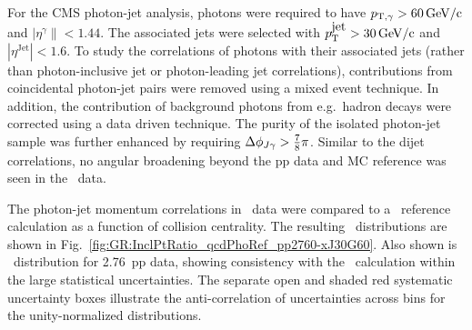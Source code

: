 For the CMS photon-jet analysis, photons were required to have $p_{\mathrm{T},\gamma} > 60\,\mathrm{GeV/c}$
and  $|\eta^\gamma\|<1.44$. The associated jets were selected with
$p_{\mathrm{T}}^{\mbox{jet}} > 30\,\mathrm{GeV/c}$ and $|\eta^{\mbox{Jet}}|<1.6$. To study the correlations of
photons with their associated jets (rather than photon-inclusive jet or photon-leading
jet correlations), contributions from
coincidental photon-jet pairs were removed using a mixed event technique. In
addition, the contribution of background photons from e.g.\ hadron decays
were corrected using a data driven technique. The purity of the isolated photon-jet
sample was further enhanced by requiring $\Delta\phi_{J\gamma} > \frac{7}{8}\pi$.
Similar to the dijet correlations, no angular broadening
beyond the pp data and MC reference was seen in the \PbPb\ data.

The photon-jet momentum correlations in \PbPb\ data were compared to a \PYTHYD\ reference
calculation as a function of collision centrality. The resulting
\xjg\ distributions are shown in Fig.~\ref{fig:GR:InclPtRatio_qcdPhoRef_pp2760-xJ30G60}.
Also shown is \avexjg\ distribution for 2.76\TeV\ pp data, showing consistency
with the \PYTHYD\ calculation within the large statistical uncertainties.
The separate open and shaded red systematic uncertainty boxes illustrate the
anti-correlation of uncertainties across bins for the unity-normalized distributions.

